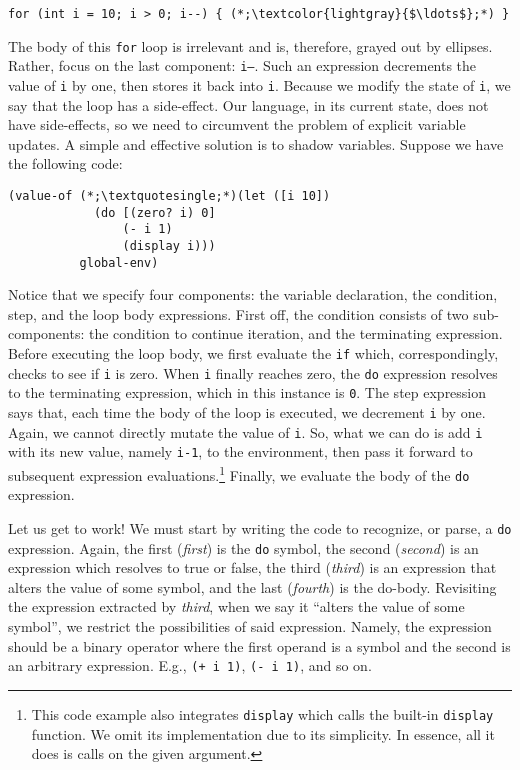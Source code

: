 \begin{cl}[]{}\begin{lstlisting}[language=MyC]
for (int i = 10; i > 0; i--) { (*;\textcolor{lightgray}{$\ldots$};*) }
\end{lstlisting}\end{cl} 

The body of this \texttt{for} loop is irrelevant and is, therefore, grayed out by ellipses. Rather, focus on the last component: \texttt{i--}. Such an expression decrements the value of \texttt{i} by one, then stores it back into \texttt{i}. Because we modify the state of \texttt{i}, we say that the loop has a side-effect. Our language, in its current state, does not have side-effects, so we need to circumvent the problem of explicit variable updates. A simple and effective solution is to shadow variables. Suppose we have the following code:

\begin{cl}[]{}\begin{lstlisting}[language=MyNLNSOutput]
(value-of (*;\textquotesingle;*)(let ([i 10])
            (do [(zero? i) 0]
                (- i 1)
                (display i))) 
          global-env)
\end{lstlisting}\end{cl}

Notice that we specify four components: the variable declaration, the condition, step, and the loop body expressions. 
First off, the condition consists of two sub-components: the condition to continue iteration, and the terminating expression. Before executing the loop body, we first evaluate the \texttt{if} which, correspondingly, checks to see if \texttt{i} is zero. When \texttt{i} finally reaches zero, the \texttt{do} expression resolves to the terminating expression, which in this instance is \texttt{0}. 
The step expression says that, each time the body of the loop is executed, we decrement \texttt{i} by one. Again, we cannot directly mutate the value of \texttt{i}. So, what we can do is add \texttt{i} with its new value, namely \texttt{i-1}, to the environment, then pass it forward to subsequent expression evaluations.\footnote{This code example also integrates \texttt{display} which calls the built-in \texttt{display} function. We omit its implementation due to its simplicity. In essence, all it does is calls  on the given argument.} Finally, we evaluate the body of the \texttt{do} expression.

Let us get to work! We must start by writing the code to recognize, or parse, a \texttt{do} expression. Again, the first (\textit{first}) is the \texttt{do} symbol, the second (\textit{second}) is an expression which resolves to true or false, the third (\textit{third}) is an expression that alters the value of some symbol, and the last (\textit{fourth}) is the do-body. Revisiting the expression extracted by \textit{third}, when we say it ``alters the value of some symbol'', we restrict the possibilities of said expression. Namely, the expression should be a binary operator where the first operand is a symbol and the second is an arbitrary expression. E.g., \texttt{(+ i 1)}, \texttt{(- i 1)}, and so on.

